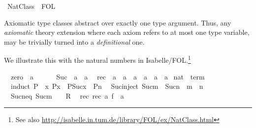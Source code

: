 %
\begin{isabellebody}%
\def\isabellecontext{NatClass}%
%
\ NatClass\ {\isacharequal}\ FOL{\isacharcolon}%
\begin{isamarkuptext}%
\medskip\noindent Axiomatic type classes abstract over exactly one
 type argument. Thus, any \emph{axiomatic} theory extension where each
 axiom refers to at most one type variable, may be trivially turned
 into a \emph{definitional} one.

 We illustrate this with the natural numbers in
 Isabelle/FOL.\footnote{See also
 \url{http://isabelle.in.tum.de/library/FOL/ex/NatClass.html}}%
\end{isamarkuptext}%
\isanewline
\ \ zero\ {\isacharcolon}{\isacharcolon}\ {\isacharprime}a\ \ \ \ {\isacharparenleft}{\isachardoublequote}{\isasymzero}{\isachardoublequote}{\isacharparenright}\isanewline
\ \ Suc\ {\isacharcolon}{\isacharcolon}\ {\isachardoublequote}{\isacharprime}a\ {\isasymRightarrow}\ {\isacharprime}a{\isachardoublequote}\isanewline
\ \ rec\ {\isacharcolon}{\isacharcolon}\ {\isachardoublequote}{\isacharprime}a\ {\isasymRightarrow}\ {\isacharprime}a\ {\isasymRightarrow}\ {\isacharparenleft}{\isacharprime}a\ {\isasymRightarrow}\ {\isacharprime}a\ {\isasymRightarrow}\ {\isacharprime}a{\isacharparenright}\ {\isasymRightarrow}\ {\isacharprime}a{\isachardoublequote}\isanewline
\isanewline
{}\ nat\ {\isacharless}\ {\isachardoublequote}term{\isachardoublequote}\isanewline
\ \ induct{\isacharcolon}\ {\isachardoublequote}P{\isacharparenleft}{\isasymzero}{\isacharparenright}\ {\isasymLongrightarrow}\ {\isacharparenleft}{\isasymAnd}x{\isachardot}\ P{\isacharparenleft}x{\isacharparenright}\ {\isasymLongrightarrow}\ P{\isacharparenleft}Suc{\isacharparenleft}x{\isacharparenright}{\isacharparenright}{\isacharparenright}\ {\isasymLongrightarrow}\ P{\isacharparenleft}n{\isacharparenright}{\isachardoublequote}\isanewline
\ \ Suc{\isacharunderscore}inject{\isacharcolon}\ {\isachardoublequote}Suc{\isacharparenleft}m{\isacharparenright}\ {\isacharequal}\ Suc{\isacharparenleft}n{\isacharparenright}\ {\isasymLongrightarrow}\ m\ {\isacharequal}\ n{\isachardoublequote}\isanewline
\ \ Suc{\isacharunderscore}neq{\isacharunderscore}{}{\isacharcolon}\ {\isachardoublequote}Suc{\isacharparenleft}m{\isacharparenright}\ {\isacharequal}\ {\isasymzero}\ {\isasymLongrightarrow}\ R{\isachardoublequote}\isanewline
\ \ rec{\isacharunderscore}{}{\isacharcolon}\ {\isachardoublequote}rec{\isacharparenleft}{\isasymzero}{\isacharcomma}\ a{\isacharcomma}\ f{\isacharparenright}\ {\isacharequal}\ a{\isachardoublequote}\isanewline

\end{isabellebody}
